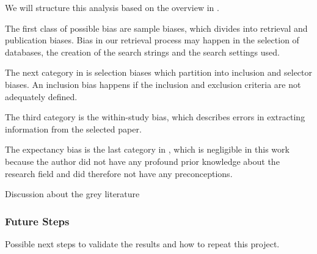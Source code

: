 We will structure this analysis based on the overview in \cite{durach_new_2017}. 

The first class of possible bias are sample biases, which divides into retrieval and publication biases. Bias in our retrieval process may happen in the selection of databases, the creation of the search strings and the search settings used. 

The next category in \cite{durach_new_2017} is selection biases which partition into inclusion and selector biases. An inclusion bias happens if the inclusion and exclusion criteria are not adequately defined. 

The third category is the within-study bias, which describes errors in extracting information from the selected paper. 

The expectancy bias is the last category in \cite{durach_new_2017}, which is negligible in this work because the author did not have any profound prior knowledge about the research field and did therefore not have any preconceptions.

Discussion about the grey literature

\subsubsection{Future Steps}
Possible next steps to validate the results and how to repeat this project.
